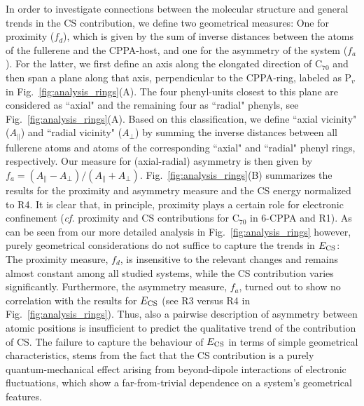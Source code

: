 \documentclass[aps,prl,groupaddress, twocolumn]{revtex4-1}
\begin{document}
In order to investigate connections between the molecular structure and general trends in the CS contribution, we define two geometrical measures:
One for proximity ($f_d$), which is given by the sum of inverse distances between the atoms of the fullerene and the CPPA-host, and one for the asymmetry of the system ($f_a$).
For the latter, we first define an axis along the elongated direction of C$_{70}$ and then span a plane along that axis, perpendicular to the CPPA-ring, labeled as P$_v$ in Fig.~\ref{fig:analysis_rings}(A).
The four phenyl-units closest to this plane are considered as ``axial" and the remaining four as ``radial" phenyls, see Fig.~\ref{fig:analysis_rings}(A).
Based on this classification, we define ``axial vicinity" ($A_{\parallel}$) and ``radial vicinity" ($A_{\perp}$) by summing the inverse distances between all fullerene atoms and atoms of the corresponding ``axial" and ``radial" phenyl rings, respectively.
Our measure for (axial-radial) asymmetry is then given by $f_a = (A_{\parallel} - A_{\perp})/(A_{\parallel} + A_{\perp})$. Fig.~\ref{fig:analysis_rings}(B) summarizes the results for the proximity and asymmetry measure and the CS energy normalized to R4.
It is clear that, in principle, proximity plays a certain role for electronic confinement (\textit{cf.} proximity and CS contributions for C$_{70}$ in 6-CPPA and R1). As can be seen from our more detailed analysis in Fig.~\ref{fig:analysis_rings} however, purely geometrical considerations do not suffice to capture the trends in $E_{\rm CS}$: The proximity measure, $f_d$, is insensitive to the relevant changes and remains almost constant among all studied systems, while the CS contribution varies significantly.
Furthermore, the asymmetry measure, $f_a$, turned out to show no correlation with the results for $E_{\rm CS}$ (see R3 versus R4 in Fig.~\ref{fig:analysis_rings}).
Thus, also a pairwise description of asymmetry between atomic positions is insufficient to predict the qualitative trend of the contribution of CS.
The failure to capture the behaviour of $E_{\rm CS}$ in terms of simple geometrical characteristics, stems from the fact that the CS contribution is a purely quantum-mechanical effect arising from beyond-dipole interactions of electronic fluctuations, which show a far-from-trivial dependence on a system's geometrical features.\\
\end{document}
